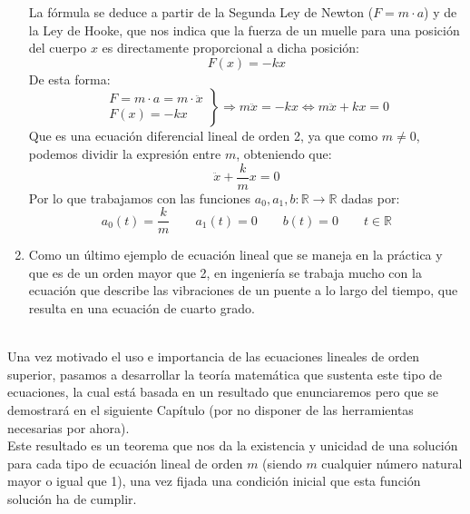 \begin{ejemplo}
\begin{enumerate}
            La fórmula se deduce a partir de la Segunda Ley de Newton ($F=m\cdot a$) y de la Ley de Hooke, que nos indica que la fuerza de un muelle para una posición del cuerpo $x$ es directamente proporcional a dicha posición:
            \begin{equation*}
                F(x) = -kx
            \end{equation*}
            De esta forma:
            \begin{equation*}
                \left.\begin{array}{rl}
                    F = m\cdot a = m\cdot \ddot{x} \\
                    F(x) = -kx
            \end{array}\right\} \Longrightarrow m\ddot{x} = -kx \Longleftrightarrow m\ddot{x} + kx = 0
            \end{equation*}
            Que es una ecuación diferencial lineal de orden 2, ya que como $m\neq 0$, podemos dividir la expresión entre $m$, obteniendo que:
            \begin{equation*}
                \ddot{x} + \dfrac{k}{m}x = 0
            \end{equation*}
            Por lo que trabajamos con las funciones $a_0,a_1,b:\mathbb{R}\rightarrow\mathbb{R}$ dadas por:
            \begin{equation*}
                a_0(t) = \dfrac{k}{m} \qquad a_1(t) = 0 \qquad b(t) = 0 \qquad t\in \mathbb{R}
            \end{equation*}
        \item Como un último ejemplo de ecuación lineal que se maneja en la práctica y que es de un orden mayor que 2, en ingeniería se trabaja mucho con la ecuación que describe las vibraciones de un puente a lo largo del tiempo, que resulta en una ecuación de cuarto grado.
    \end{enumerate}
\end{ejemplo}~\\

Una vez motivado el uso e importancia de las ecuaciones lineales de orden superior, pasamos a desarrollar la teoría matemática que sustenta este tipo de ecuaciones, la cual está basada en un resultado que enunciaremos pero que se demostrará en el siguiente Capítulo (por no disponer de las herramientas necesarias por ahora).\\

Este resultado es un teorema que nos da la existencia y unicidad de una solución para cada tipo de ecuación lineal de orden $m$ (siendo $m$ cualquier número natural mayor o igual que 1), una vez fijada una condición inicial que esta función solución ha de cumplir.

